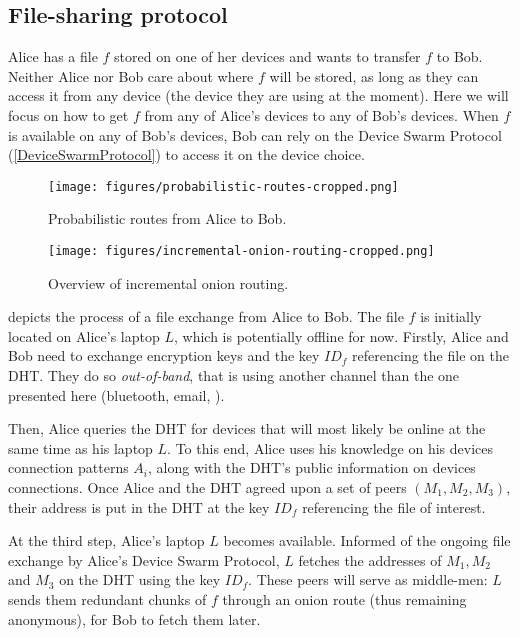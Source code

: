 
\subsection{File-sharing protocol}%
\label{FileSharingProtocol}

Alice has a file \(f\) stored on one of her devices and wants to transfer \(f\) 
to Bob.
Neither Alice nor Bob care about where \(f\) will be stored, as long as they can 
access it from any device (\ie the device they are using at the moment).
Here we will focus on how to get \(f\) from any of Alice's devices to any of 
Bob's devices.
When \(f\) is available on any of Bob's devices, Bob can rely on the Device 
Swarm Protocol (\cref{DeviceSwarmProtocol}) to access it on the device choice.

\begin{figure*}
  \centering
  \texttt{[image: figures/probabilistic-routes-cropped.png]}
  \caption{\label{ProbabilisticRoutes}%
    Probabilistic routes from Alice to Bob.
  }
\end{figure*}

\begin{figure*}
  \centering
  \texttt{[image: figures/incremental-onion-routing-cropped.png]}
  \caption{\label{IncrementalOnionRouting}%
    Overview of incremental onion routing.
  }
\end{figure*}

 depicts the process of a file exchange from Alice to Bob.
The file $f$ is initially located on Alice's laptop $L$, which is potentially offline for now.
Firstly, Alice and Bob need to exchange encryption keys and the key $ID_f$ 
referencing the file on the \ac{DHT}.
They do so \emph{out-of-band}, that is using another channel than the one 
presented here (\eg bluetooth, email, \etc).

Then, Alice queries the DHT for devices that will most likely be online at the same time as his laptop $L$.
To this end, Alice uses his knowledge on his devices connection patterns $A_i$, along with the DHT's public information on devices connections.
Once Alice and the DHT agreed upon a set of peers $(M_1, M_2, M_3)$, their address is put in the DHT at the key $ID_f$ referencing the file of interest.

At the third step, Alice's laptop $L$ becomes available. 
Informed of the ongoing file exchange by Alice's Device Swarm Protocol, $L$ fetches the addresses of $M_1, M_2$ and $M_3$ on the DHT using the key $ID_f$.
These peers will serve as middle-men: $L$ sends them redundant chunks of $f$ through an onion route (thus remaining anonymous), for Bob to fetch them later.

